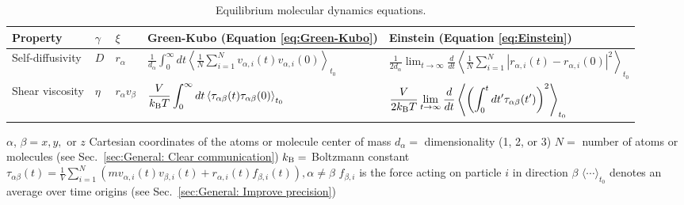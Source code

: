 \documentclass[9pt,bestpractices]{livecoms}
\begin{document}
\begin{table}[tb]
	\caption{\label{tab:EMD_equations}Equilibrium molecular dynamics equations.}

	\begin{tabular}{l l l l l}
		\toprule
		Property & $\gamma$          & $\xi$                        & Green-Kubo (Equation \ref{eq:Green-Kubo})    & Einstein (Equation \ref{eq:Einstein})     \\
		\midrule
		Self-diffusivity     & $D$ & $r_{\alpha}$          & $ \displaystyle \frac{1}{d_\alpha} \int_{0}^{\infty}dt\left\langle \frac{1}{N} \sum_{i=1}^{N} v_{\alpha,i}(t) v_{\alpha,i}(0)\right\rangle_{t_0}$    & $ \displaystyle \frac{1}{2d_\alpha} \lim_{t\to\infty} \frac{d}{dt} \left\langle \frac{1}{N} \sum_{i=1}^{N} |r_{\alpha,i}(t)-r_{\alpha,i}(0)|^2 \right\rangle_{t_0}$   \\
		Shear viscosity     & $\eta$       & $r_\alpha v_\beta$           & $ \displaystyle \frac{V}{k_{\rm B}T} \int_{0}^{\infty}dt\left\langle \tau_{\alpha\beta}(t) \tau_{\alpha\beta}(0)\right\rangle_{t_0}$    & $ \displaystyle \frac{V}{2k_{\rm B}T} \lim_{t\to\infty} \frac{d}{dt} \left\langle \left(\int_{0}^{t}dt' \tau_{\alpha\beta}(t')\right)^2 \right\rangle_{t_0}$  \\
		\bottomrule
	\end{tabular}
	\newline
	$\alpha$, $\beta = x, y, $ or $z$ Cartesian coordinates of the atoms or molecule center of mass \newline
	$d_\alpha =$ dimensionality (1, 2, or 3) \newline
	$N=$ number of atoms or molecules (see Sec.\ \ref{sec:General: Clear communication}) \newline
	$k_{\rm B}=$ Boltzmann constant \newline
	$\tau_{\alpha\beta}(t) = \frac{1}{V} \sum_{i=1}^{N} \left( m v_{\alpha,i}(t) v_{\beta,i}(t) + r_{\alpha,i}(t) f_{\beta,i}(t) \right) , \alpha \ne \beta$ \newline
	$f_{\beta,i}$ is the force acting on particle $i$ in direction $\beta$ \newline
	$\langle \cdots \rangle_{t_0}$ denotes an average over time origins (see Sec.\ \ref{sec:General: Improve precision})
\end{table}
\end{document}

